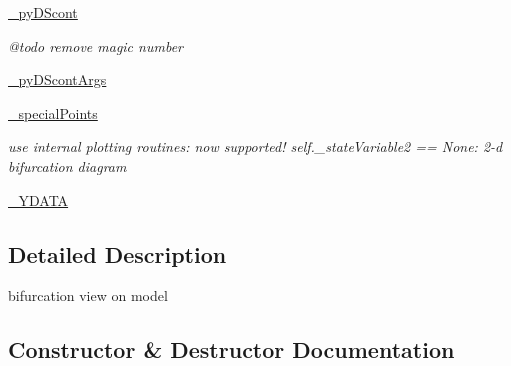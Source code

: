 \begin{DoxyCompactItemize}
\hyperlink{class_mu_mo_t_1_1_mu_mo_t_1_1_mu_mo_tbifurcation_view_a797e92fe19ce2636a49bf1400a69fc49}{\+\_\+py\+D\+Scont}
\begin{DoxyCompactList}\small\item\em @todo remove magic number \end{DoxyCompactList}\item 
\hyperlink{class_mu_mo_t_1_1_mu_mo_t_1_1_mu_mo_tbifurcation_view_aa56e2cffc879be68fdec55f29334415c}{\+\_\+py\+D\+Scont\+Args}
\item 
\hyperlink{class_mu_mo_t_1_1_mu_mo_t_1_1_mu_mo_tbifurcation_view_a0b40fc612e7c7203adf3274967cdd2ab}{\+\_\+special\+Points}
\begin{DoxyCompactList}\small\item\em use internal plotting routines\+: now supported! self.\+\_\+state\+Variable2 == None\+: 2-\/d bifurcation diagram \end{DoxyCompactList}\item 
\hyperlink{class_mu_mo_t_1_1_mu_mo_t_1_1_mu_mo_tbifurcation_view_a225ffda570ae3d9d5675af2fe28c1cbe}{\+\_\+\+Y\+D\+A\+TA}
\end{DoxyCompactItemize}


\subsection{Detailed Description}
bifurcation view on model 

\subsection{Constructor \& Destructor Documentation}
\mbox{\label{class_mu_mo_t_1_1_mu_mo_t_1_1_mu_mo_tbifurcation_view_ac1764fc6547304e629425a5329dc7083}} 
